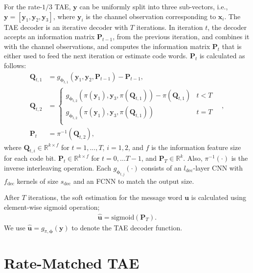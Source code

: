 \documentclass [PhD] {uclathes}
\begin{document}
For the rate-${1}/{3}$ TAE, $\mathbf{y}$ can be uniformly split into three sub-vectors, i.e., $\mathbf{y}=[\mathbf{y}_1,\mathbf{y}_2,\mathbf{y}_3]$, where $\mathbf{y}_i$ is the  channel observation corresponding to $\mathbf{x}_i$. The TAE decoder is an iterative decoder with $T$ iterations. In iteration $t$, the decoder accepts an information matrix $\mathbf{P}_{t-1}$, from the previous iteration, and combines it with the channel observations, and computes the information matrix $\mathbf{P}_{t}$ that is either used to feed the next iteration or estimate code words. $\mathbf{P}_{t}$ is calculated as follows: 
\begin{align}  \mathbf{Q}_{t,1}&=g_{{\boldsymbol\phi}_{t,1}}(\mathbf{y}_1,\mathbf{y}_2,\mathbf{P}_{t-1})-\mathbf{P}_{t-1},\\
    \mathbf{Q}_{t,2}&=\left\{\begin{matrix}
     g_{{\boldsymbol\phi}_{t,2}}(\pi(\mathbf{y}_1),\mathbf{y}_3,\pi(\mathbf{Q}_{t,1}))-\pi(\mathbf{Q}_{t,1})& t<T \\ 
     g_{{\boldsymbol\phi}_{t,2}}(\pi(\mathbf{y}_1),\mathbf{y}_3,\pi(\mathbf{Q}_{t,1})) &  t=T  \\
    \end{matrix}\quad,\right.\\ %
    \mathbf{P}_{t}&=\pi^{-1}(\mathbf{Q}_{t,2}),
    \end{align}
    where $\mathbf{Q}_{t,i}\in\mathbb{R}^{k\times f}$ for $t=1,...,T$, $i=1,2$, and $f$ is the information feature size for each code bit. $\mathbf{P}_t\in\mathbb{R}^{k\times f}$ for $t=0,\ldots T-1$, and $\mathbf{P}_T\in\mathbb{R}^{k}$. Also, $\pi^{-1}(\cdot)$ is the inverse interleaving operation. Each $g_{\boldsymbol{\phi}_{t,j}}(\cdot)$ consists of  an  $l_{\text{dec}}$-layer CNN with  $f_{\text{dec}}$  kernels of size $s_{\text{dec}}$ and an FCNN to match the output size.
    
    After $T$ iterations, the soft estimation for the  message word $\mathbf{u}$ is calculated using element-wise sigmoid operation;
    \begin{align}
        \hat{\mathbf{u}}=\text{sigmoid}\left(\mathbf{P}_T\right).
    \end{align}
    We use $\hat{\mathbf{u}}=g_{\pi,{\boldsymbol\phi}}(\mathbf{y})$ to denote the TAE decoder function.

    \section{Rate-Matched TAE}\label{sec: rate_matched_TAE}
\end{document}
